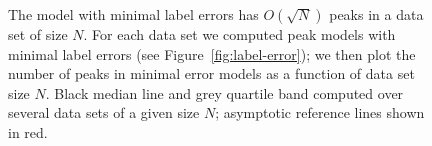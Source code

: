 \documentclass[article]{jss}
\begin{document}
\begin{figure}[t!]
\centering

\caption{\label{fig:data-peaks} The model with minimal label
  errors has $O(\sqrt{N})$ peaks in a data set of size $N$. For each data set we
  computed peak models with minimal label errors (see
  Figure~\ref{fig:label-error}); we then plot the number of peaks in
  minimal error models as a function of data set size $N$. Black median line
  and grey quartile band computed over several data sets of a given size
  $N$; asymptotic reference lines shown in red.}
\end{figure}
  

\end{document}

